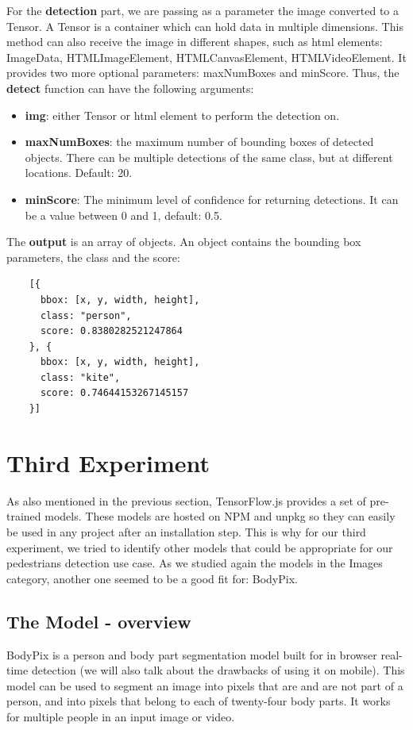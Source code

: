 \documentclass[runningheads,a4paper,11pt]{report}
\begin{document}
For the \textbf{detection} part, we are passing as a parameter the image converted to a Tensor. A Tensor is a container which can hold data in multiple dimensions. This method can also receive the image in different shapes, such as html elements: ImageData, HTMLImageElement, HTMLCanvasElement, HTMLVideoElement. It provides two more optional parameters: maxNumBoxes and minScore. Thus, the \textbf{detect} function can have the following arguments:
\begin{itemize}
  \item \textbf{img}: either Tensor or html element to perform the detection on.
  \item \textbf{maxNumBoxes}: the maximum number of bounding boxes of detected objects. There can be multiple detections of the same class, but at different locations. Default: 20.
  \item \textbf{minScore}: The minimum level of confidence for returning detections. It can be a value between 0 and 1, default: 0.5. 
\end{itemize}

The \textbf{output} is an array of objects. An object contains the bounding box parameters, the class and the score: 

\begin{lstlisting}
    [{
      bbox: [x, y, width, height],
      class: "person",
      score: 0.8380282521247864
    }, {
      bbox: [x, y, width, height],
      class: "kite",
      score: 0.74644153267145157
    }]
\end{lstlisting}


\section{Third Experiment}
\label{section:thirdExperiment}
As also mentioned in the previous section, TensorFlow.js provides a set of pre-trained models. These models are hosted on NPM and unpkg so they can easily be used in any project after an installation step. This is why for our third experiment, we tried to identify other models that could be appropriate for our pedestrians detection use case. As we studied again the models in the Images category, another one seemed to be a good fit for: BodyPix.

\subsection{The Model - overview}
\label{section:theModelOverview2}
BodyPix is a person and body part segmentation model built for in browser real-time detection (we will also talk about the drawbacks of using it on mobile). This model can be used to segment an image into pixels that are and are not part of a person, and into pixels that belong to each of twenty-four body parts. It works for multiple people in an input image or video. 
\end{document}
